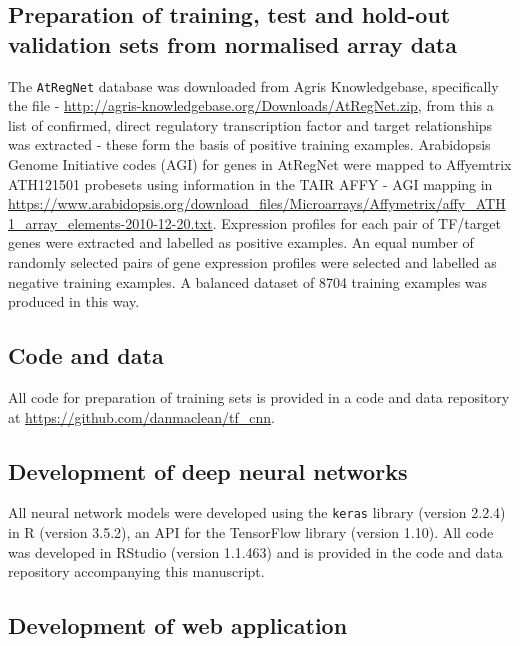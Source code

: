 \documentclass[12pt,a4paper,]{article}
\begin{document}
\hypertarget{preparation-of-training-test-and-hold-out-validation-sets-from-normalised-array-data}{%
\subsection{Preparation of training, test and hold-out validation sets from normalised array data}\label{preparation-of-training-test-and-hold-out-validation-sets-from-normalised-array-data}}

The \texttt{AtRegNet} database was downloaded from Agris Knowledgebase, specifically the file - \href{}{http://agris-knowledgebase.org/Downloads/AtRegNet.zip}, from this a list of confirmed, direct regulatory transcription factor and target relationships was extracted - these form the basis of positive training examples. Arabidopsis Genome Initiative codes (AGI) for genes in AtRegNet were mapped to Affyemtrix ATH121501 probesets using information in the TAIR AFFY - AGI mapping in \href{}{https://www.arabidopsis.org/download\_files/Microarrays/Affymetrix/affy\_ATH1\_array\_elements-2010-12-20.txt}. Expression profiles for each pair of TF/target genes were extracted and labelled as positive examples. An equal number of randomly selected pairs of gene expression profiles were selected and labelled as negative training examples. A balanced dataset of 8704 training examples was produced in this way.

\hypertarget{code-and-data}{%
\subsection{Code and data}\label{code-and-data}}

All code for preparation of training sets is provided in a code and data repository at \href{}{https://github.com/danmaclean/tf\_cnn}.

\hypertarget{development-of-deep-neural-networks}{%
\subsection{Development of deep neural networks}\label{development-of-deep-neural-networks}}

All neural network models were developed using the \texttt{keras} library (version 2.2.4) in R (version 3.5.2), an API for the TensorFlow library (version 1.10). All code was developed in RStudio (version 1.1.463) and is provided in the code and data repository accompanying this manuscript.

\hypertarget{development-of-web-application}{%
\subsection{Development of web application}\label{development-of-web-application}}
\end{document}
